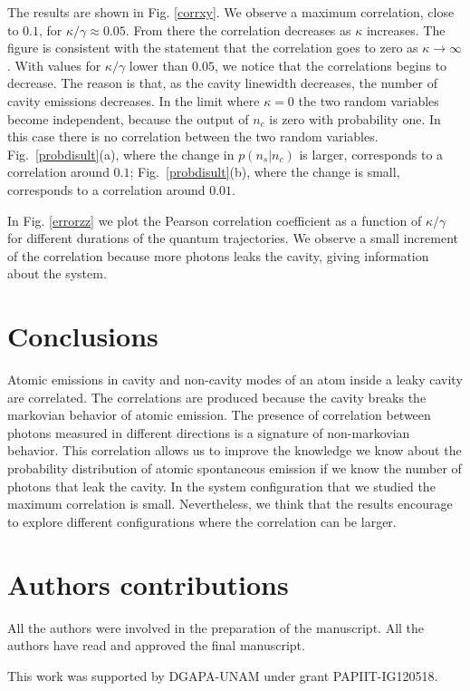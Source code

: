 \documentclass[epj,final]{svjour}
\begin{document}
The results are shown in Fig. \ref{corrxy}. We observe a maximum
correlation, close to $0.1$, for $\kappa/\gamma\approx 0.05$. From
there the correlation decreases as $\kappa$ increases. The figure is
consistent with the statement that the correlation goes to zero as
$\kappa\rightarrow\infty$. With values for $\kappa/\gamma$ lower than
$0.05$, we notice that the correlations begins to decrease. The reason
is that, as the cavity linewidth decreases, the number of cavity
emissions decreases. In the limit where $\kappa=0$ the two random
variables become independent, because the output of $n_c$ is zero
with probability one. In this case there is no correlation between the
two random variables. Fig.~\ref{probdisult}(a), where the change in
$p(n_s|n_c)$ is larger, corresponds to a correlation around $0.1$;
Fig.~\ref{probdisult}(b), where the change is small, corresponds to a
correlation around $0.01$.


In Fig. \ref{errorzz} we plot the Pearson correlation coefficient as a
function of $\kappa/\gamma$ for different durations of the quantum
trajectories. We observe a small increment of the correlation
because more photons leaks the cavity, giving information about the
system.


\section{Conclusions}\label{sc:conclusions}
Atomic emissions in cavity and non-cavity modes of an atom inside a
leaky cavity are correlated. The correlations are produced because the
cavity breaks the markovian behavior of atomic emission. The presence
of correlation between photons measured in different directions is a
signature of non-markovian behavior. This correlation allows us to
improve the knowledge we know about the probability distribution of
atomic spontaneous emission if we know the number of photons that leak
the cavity. In the system configuration that we studied the maximum
correlation is small. Nevertheless, we think that the results
encourage to explore different configurations where the correlation
can be larger.


\section{Authors contributions}
All the authors were involved in the preparation of the manuscript.
All the authors have read and approved the final manuscript.


\begin{acknowledgement}
This work was supported by DGAPA-UNAM under grant PAPIIT-IG120518.
\end{acknowledgement}

\end{document}
